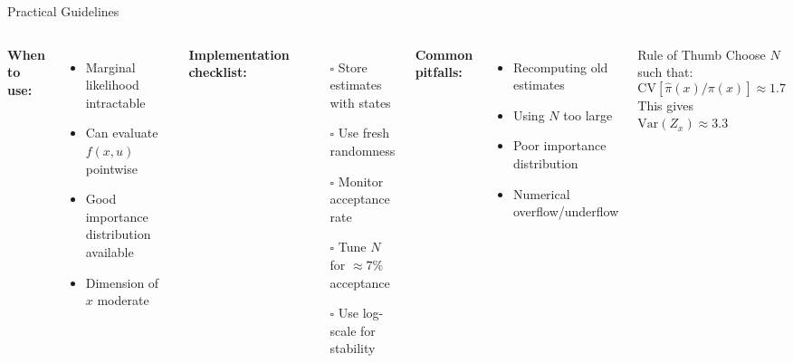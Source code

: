 \documentclass[aspectratio=169]{beamer}
\begin{document}
\begin{frame}{Practical Guidelines}

	\begin{columns}
		\textbf{When to use:}
		\begin{itemize}
			\item Marginal likelihood intractable
			\item Can evaluate $f(x,u)$ pointwise
			\item Good importance distribution available
			\item Dimension of $x$ moderate
		\end{itemize}

		\vspace{0.5cm}
		\textbf{Implementation checklist:}
		\begin{enumerate}
			\item[\color{copenhagenred}$\square$] Store estimates with states
			\item[\color{copenhagenred}$\square$] Use fresh randomness
			\item[\color{copenhagenred}$\square$] Monitor acceptance rate
			\item[\color{copenhagenred}$\square$] Tune $N$ for $\approx 7\%$ acceptance
			\item[\color{copenhagenred}$\square$] Use log-scale for stability
		\end{enumerate}

		\textbf{Common pitfalls:}
		\begin{itemize}
			\item Recomputing old estimates
			\item Using $N$ too large
			\item Poor importance distribution
			\item Numerical overflow/underflow
		\end{itemize}

		\vspace{0.5cm}
		\begin{block}{Rule of Thumb}
			Choose $N$ such that:
			$$\text{CV}[\hat{\pi}(x)/\pi(x)] \approx 1.7$$
			This gives $\text{Var}(Z_x) \approx 3.3$
		\end{block}
	\end{columns}
\end{frame}
\end{document}
